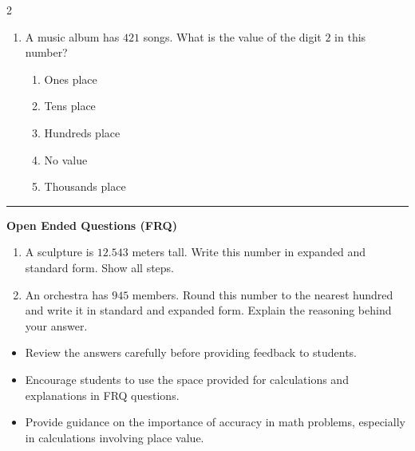 \documentclass[10pt]{article}
\begin{document}
\begin{multicols}{2}
\begin{enumerate}[label=\textbf{Q\arabic*.}, leftmargin=*, itemsep=6pt, parsep=0pt]
  \item \small A music album has $421$ songs. What is the value of the digit $2$ in this number?
  \begin{enumerate}[label=(\Alph*), leftmargin=0.6cm, nosep, itemsep=2pt]
    \item Ones place
    \item Tens place
    \item Hundreds place
    \item No value
    \item Thousands place
  \end{enumerate}

\end{enumerate}
\end{multicols}

\vspace{-0.2cm}
\hrule
\vspace{0.2cm}
\textbf{\small Open Ended Questions (FRQ)}
\begin{enumerate}[label=\textbf{Q\arabic*.}, start=9, itemsep=5pt, topsep=0pt]

  \item \small A sculpture is $12.543$ meters tall. Write this number in expanded and standard form. Show all steps. \vspace{2cm}

  \item \small An orchestra has $945$ members. Round this number to the nearest hundred and write it in standard and expanded form. Explain the reasoning behind your answer. \vspace{2cm}

\end{enumerate}

\vfill

\begin{tcolorbox}[colback=blue!5, colframe=mainblue!50, title=\small \textbf{Chef's Tips}, fonttitle=\bfseries, bottom=1mm]
\begin{itemize}[noitemsep, topsep=2pt, leftmargin=0.5cm]
  \item \scriptsize Review the answers carefully before providing feedback to students.\item \scriptsize Encourage students to use the space provided for calculations and explanations in FRQ questions.\item \scriptsize Provide guidance on the importance of accuracy in math problems, especially in calculations involving place value.
\end{itemize}
\end{tcolorbox}
\end{document}
